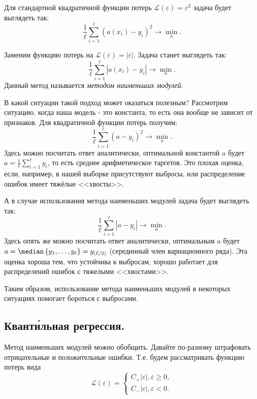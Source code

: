 Для стандартной квадратичной функции потерь $\mathscr{L}(\varepsilon) = \varepsilon^2$ задача будет выглядеть так:
$$\frac{1}{\ell}\sum\limits_{i=1}^\ell\left(a(x_i) - y_i\right)^2 \longrightarrow \min\limits_{a}.$$

Заменим функцию потерь на $\mathscr{L}(\varepsilon) = |\varepsilon|$.
Задача станет выглядеть так:
$$\frac{1}{\ell}\sum\limits_{i=1}^\ell\left|a(x_i) - y_i\right| \longrightarrow \min\limits_{a}.$$
Данный метод называется \textit{методом наименьших модулей}.

В какой ситуации такой подход может оказаться полезным? Рассмотрим ситуацию,  когда наша модель - это константа, то есть она вообще не зависит от признаков. Для квадратичной функции потерь получим:
$$\frac{1}{\ell}\sum\limits_{i=1}^\ell\left(a - y_i\right)^2 \longrightarrow \min\limits_{a}.$$
Здесь можно посчитать ответ аналитически, оптимальной константой $a$ будет $a = \frac{1}{\ell}\sum\limits_{i=1}^\ell y_i$, то есть среднее арифметическое таргетов. Это плохая оценка, если, например, в нашей выборке присутствуют выбросы, или распределение ошибок имеет тяжёлые <<хвосты>>.

А в случае использования метода наименьших модулей задача будет выглядеть так:
$$\frac{1}{\ell}\sum\limits_{i=1}^\ell\left|a - y_i\right| \longrightarrow \min\limits_{a}.$$
Здесь опять же можно посчитать ответ аналитически, оптимальным $a$ будет $a = \median\left\{ y_1, \dotsc, y_\ell \right\} = y_{(\ell / 2)}$ (серединный член вариационного ряда). Эта оценка хороша тем, что устойчива к выбросам, хорошо работает для распределений ошибок с тяжелыми <<хвостами>>.

Таким образом, использование метода наименьших модулей в некоторых ситуациях помогает бороться с выбросами.

\subsection*{Квант\'{и}льная регрессия.}

Метод наименьших модулей можно обобщить. Давайте по-разному штрафовать отрицательные и положительные ошибки. Т.е. будем рассматривать функцию потерь вида
$$\mathscr{L}(\varepsilon) = \begin{cases}
    C_+|\varepsilon|, \varepsilon \geq 0,\\
    C_-|\varepsilon|, \varepsilon < 0.
\end{cases}$$

